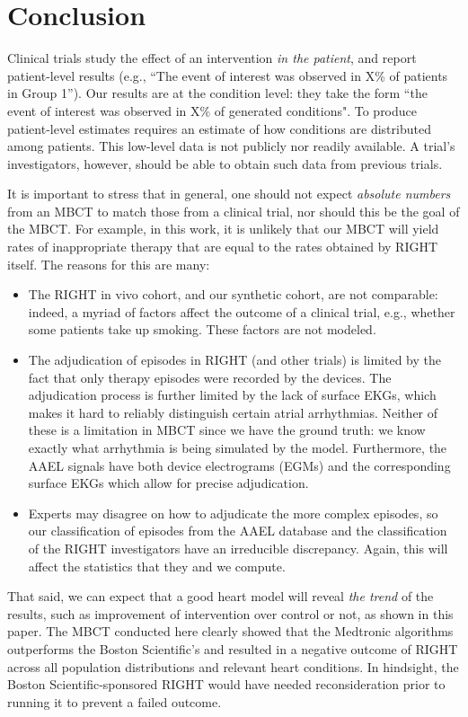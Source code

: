 \section{Conclusion}
\label{sec:conclusion}

Clinical trials study the effect of an intervention \emph{in the patient}, and report patient-level results (e.g., ``The event of interest was observed in X\% of patients in Group 1''). 
Our results are at the condition level: they take the form ``the event of interest was observed in X\% of generated conditions".
To produce patient-level estimates requires an estimate of how conditions are distributed among patients. 
This low-level data is not publicly nor readily available.
A trial's investigators, however, should be able to obtain such data from previous trials.

It is important to stress that in general, one should not expect \emph{absolute numbers} from an MBCT to match those from a clinical trial, nor should this be the goal of the MBCT.
For example, in this work, it is unlikely that our MBCT will yield rates of inappropriate therapy that are equal to the rates obtained by RIGHT itself.
The reasons for this are many:
\begin{itemize}
	\item The RIGHT in vivo cohort, and our synthetic cohort, are not comparable:
	indeed, a myriad of factors affect the outcome of a clinical trial, e.g., whether some patients take up smoking. 
	These factors are not modeled.
	\item The adjudication of episodes in RIGHT (and other trials) is limited by the fact that only therapy episodes were recorded by the devices.
	The adjudication process is further limited by the lack of surface EKGs, which makes it hard to reliably distinguish certain atrial arrhythmias. 
	Neither of these is a limitation in MBCT since we have the ground truth: we know exactly what arrhythmia is being simulated by the model.  Furthermore, the AAEL signals have both device electrograms (EGMs) and the corresponding surface EKGs which allow for precise adjudication.  
	\item Experts may disagree on how to adjudicate the more complex episodes, so our classification of episodes from the AAEL database and the classification of the RIGHT investigators have an irreducible discrepancy.
	Again, this will affect the statistics that they and we compute.
\end{itemize}

That said, we can expect that a good heart model will reveal \emph{the trend} of the results, such as improvement of intervention over control or not, as shown in this paper. 
The MBCT conducted here clearly showed that the Medtronic algorithms outperforms the Boston Scientific's and resulted in a negative outcome of RIGHT across all population distributions and relevant heart conditions. In hindsight, the Boston Scientific-sponsored RIGHT would have needed reconsideration prior to running it to prevent a failed outcome.

